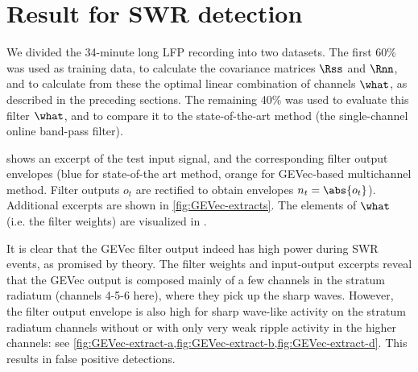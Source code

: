 \section{Result for SWR detection}

We divided the 34-minute long LFP recording into two datasets. The first 60\% was used as training data, to calculate the covariance matrices $\Rss$ and $\Rnn$, and to calculate from these the optimal linear combination of channels $\what$, as described in the preceding sections. The remaining 40\% was used to evaluate this filter $\what$, and to compare it to the state-of-the-art method (the single-channel online band-pass filter).

\begin{figure}
\label{fig:LSM-comp}
\end{figure}

 shows an excerpt of the test input signal, and the corresponding filter output envelopes (blue for state-of-the art method, orange for GEVec-based multichannel method. Filter outputs $o_t$ are rectified to obtain envelopes $n_t = \abs{o_t}$). Additional excerpts are shown in \cref{fig:GEVec-extracts}. The elements of $\what$ (i.e. the filter weights) are visualized in .

It is clear that the GEVec filter output indeed has high power during SWR events, as promised by theory. The filter weights and input-output excerpts reveal that the GEVec output is composed mainly of a few channels in the stratum radiatum (channels 4-5-6 here), where they pick up the sharp waves. However, the filter output envelope is also high for sharp wave-like activity on the stratum radiatum channels without or with only very weak ripple activity in the higher channels: see \cref{fig:GEVec-extract-a,fig:GEVec-extract-b,fig:GEVec-extract-d}. This results in false positive detections.

